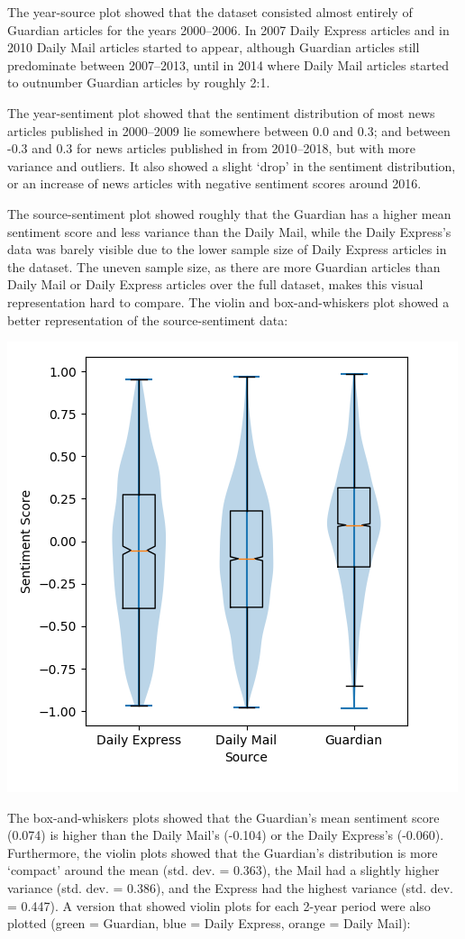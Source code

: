 \documentclass{report}
\begin{document}
The year-source plot showed that the dataset consisted almost entirely of Guardian articles for the years 2000--2006. In 2007 Daily Express articles and in 2010 Daily Mail articles started to appear, although Guardian articles still predominate between 2007--2013, until in 2014 where Daily Mail articles started to outnumber Guardian articles by roughly 2:1.

The year-sentiment plot showed that the sentiment distribution of most news articles published in 2000--2009 lie somewhere between 0.0 and 0.3; 
and between -0.3 and 0.3 for news articles published in from 2010--2018, but with more variance and outliers. 
It also showed a slight `drop' in the sentiment distribution, or an increase of news articles with negative sentiment scores around 2016.

The source-sentiment plot showed roughly that the Guardian has a higher mean sentiment score and less variance than the Daily Mail, while the Daily Express's data was barely visible due to the lower sample size of Daily Express articles in the dataset.
The uneven sample size, as there are more Guardian articles than Daily Mail or Daily Express articles over the full dataset, makes this visual representation hard to compare. 
The violin \cite{hintze1998violin} and box-and-whiskers plot \cite{tukey1977exploratory} showed a better representation of the source-sentiment data:

\begin{center}
	\includegraphics[width=0.5\linewidth]{row-3-col-1.png}
\end{center}

The box-and-whiskers plots showed that the Guardian's mean sentiment score (0.074) is higher than the Daily Mail's (-0.104) or the Daily Express's (-0.060).
Furthermore, the violin plots showed that the Guardian's distribution is more `compact' around the mean (std. dev. = 0.363), the Mail had a slightly higher variance (std. dev. = 0.386), and the Express had the highest variance (std. dev. = 0.447). A version that showed violin plots for each 2-year period were also plotted (green = Guardian, blue = Daily Express, orange = Daily Mail):
\end{document}
